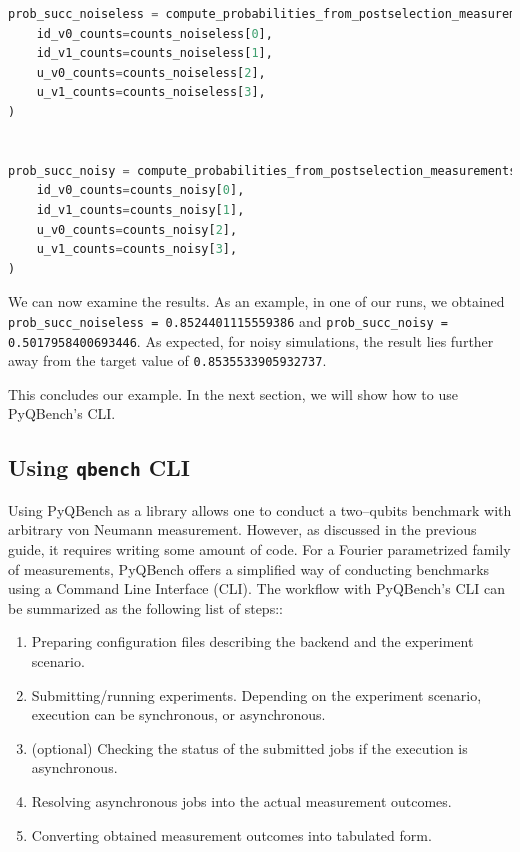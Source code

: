 \documentclass[preprint,12pt, a4paper, dvipsnames]{elsarticle}
\newcommand{\1}{{\rm 1\hspace{-0.9mm}l}}
\theoremstyle{definition}
\begin{document}
\begin{lstlisting}[language=Python, caption=Computation probabilities]
prob_succ_noiseless = compute_probabilities_from_postselection_measurements(
	id_v0_counts=counts_noiseless[0],
	id_v1_counts=counts_noiseless[1],
	u_v0_counts=counts_noiseless[2],
	u_v1_counts=counts_noiseless[3],
)


prob_succ_noisy = compute_probabilities_from_postselection_measurements(
	id_v0_counts=counts_noisy[0],
	id_v1_counts=counts_noisy[1],
	u_v0_counts=counts_noisy[2],
	u_v1_counts=counts_noisy[3],
)

\end{lstlisting}

We can now examine the results. As an example, in one of our runs, we obtained
\texttt{prob\_succ\_noiseless = 0.8524401115559386} and \texttt{prob\_succ\_noisy =
0.5017958400693446}. As expected, for noisy simulations, the result lies further
away from the target value of \texttt{0.8535533905932737}.

This concludes our example. In the next section, we will show how to use PyQBench's CLI.

\subsection{Using \texttt{qbench} CLI}
Using PyQBench as a library allows one to conduct a two--qubits benchmark with arbitrary von Neumann
measurement. However, as discussed in the previous guide, it requires writing some amount of code.
For a Fourier parametrized family of measurements, PyQBench offers a simplified way of conducting
benchmarks using a Command Line Interface (CLI). The workflow with PyQBench's CLI can be summarized
as the following list of steps::

\begin{enumerate}

\item Preparing configuration files describing the backend and the experiment scenario.
\item Submitting/running experiments. Depending on the experiment scenario, execution can be synchronous, or asynchronous.
\item (optional) Checking the status of the submitted jobs if the execution is asynchronous.
\item Resolving asynchronous jobs into the actual measurement outcomes.
\item Converting obtained measurement outcomes into tabulated form.
\end{enumerate}
\end{document}
